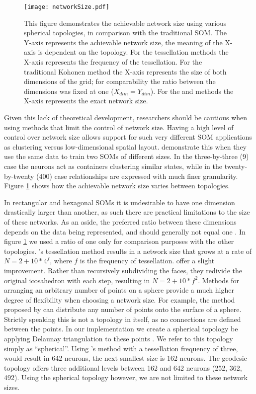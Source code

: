 \begin{figure}[htb]
\centering
\texttt{[image: networkSize.pdf]}
\caption{This figure demonstrates the achievable network size using various
spherical topologies, in comparison with the traditional SOM. The Y-axis represents the achievable network size, the
meaning of the X-axis is dependent on the topology. For the tessellation
methods the X-axis represents the frequency of the tessellation. For the
traditional Kohonen method the X-axis represents the size of both dimensions of
the grid; for comparability the ratio between the dimensions was fixed at one
($X_{dim}=Y_{dim}$).  For the \cite{Rakhmanov94} and \cite{Nishio:2006fk} methods the X-axis
represents the exact network size.}
\label{fig:nSize}
\end{figure}

Given this lack of theoretical development, researchers should be cautious
when using methods that limit the control of network size.  Having a high
level of control over network size allows support for such very different SOM
applications as clustering versus low-dimensional spatial layout.
\cite{skupin08} demonstrate this when they use the same data to train two SOMs
of different sizes.  In the three-by-three (9) case the neurons act as
containers clustering similar states, while in the twenty-by-twenty (400) case
relationships are expressed with much finer granularity.  Figure
\ref{fig:nSize} shows how the achievable network size varies between
topologies.

In rectangular and hexagonal SOMs it is undesirable to have one dimension
drastically larger than another, as such there are practical limitations to
the size of these networks.  As an aside, the preferred ratio between these
dimensions depends on the data being represented, and should generally not
equal one \citep{kohonen1996, toolbox}.  In figure \ref{fig:nSize} we used a
ratio of one only for comparison purposes with the other topologies.
\citeauthor{ritter99}'s tessellation method results in a network size that
grows at a rate of \(N=2+10*4^f\), where $f$ is the frequency of tessellation.
\cite{wu2006} offer a slight improvement. Rather than recursively subdividing
the faces, they redivide the original icosahedron with each step, resulting in
\(N=2+10*f^2\).  Methods for arranging an arbitrary number of points on a
sphere provide a much higher degree of flexibility when choosing a network
size.  For example, the method proposed by \cite{Rakhmanov94} can
distribute any number of points onto the surface of a sphere.  Strictly
speaking this is not a topology in itself, as no connections are defined
between the points.  In our implementation we create a spherical topology be
applying Delaunay triangulation to these points \cite{Ranka97}.  We refer to
this topology simply as ``spherical''. Using \citeauthor{ritter99}'s method
with a tessellation frequency of three, would result in 642 neurons, the next
smallest size is 162 neurons.  The geodesic topology offers three additional
levels between 162 and 642 neurons (252, 362, 492).  Using the spherical
topology however, we are not limited to these network sizes.

